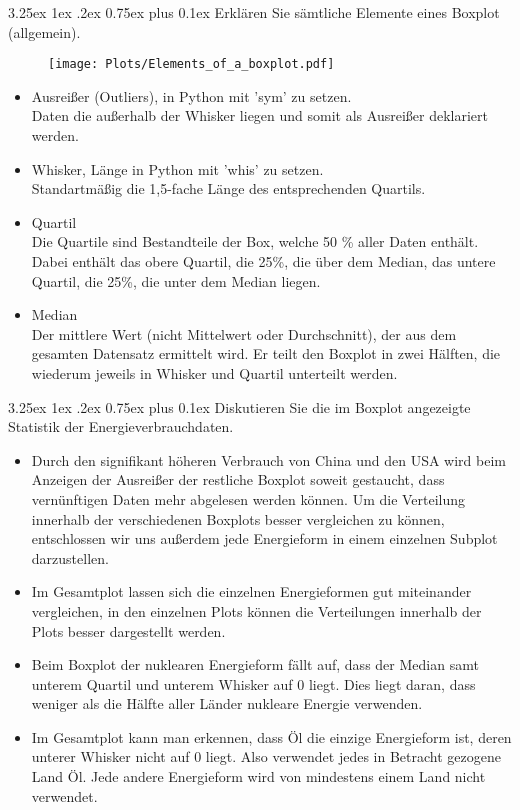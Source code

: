 \documentclass[12pt,a4paper]{scrartcl}
\makeatletter
\renewcommand\subparagraph{\@startsection{subparagraph}{5}{\parindent}%
    {3.25ex \@plus1ex \@minus .2ex}%
    {0.75ex plus 0.1ex}%
    {\normalfont\normalsize\bfseries}}
\makeatother
\begin{document}
\subparagraph{Erkl\"aren Sie s\"amtliche Elemente eines Boxplot (allgemein). }
\begin{figure}[!h]
\centering
\texttt{[image: Plots/Elements\_of\_a\_boxplot.pdf]}
\end{figure}
\begin{itemize}
\item Ausrei\ss er (\grqq Outliers\grqq ), in Python mit 'sym' zu setzen. \\
Daten die au\ss erhalb der Whisker liegen und somit als Ausrei\ss er deklariert werden.
\item Whisker, L\"ange in Python mit 'whis' zu setzen.\\
Standartm\"a\ss ig die 1,5-fache L\"ange des entsprechenden Quartils. 
\item Quartil\\
Die Quartile sind Bestandteile der Box, welche 50 \% aller Daten enth\"alt. Dabei enth\"alt das obere Quartil, die 25\%, die \"uber dem Median, das untere Quartil, die 25\%, die unter dem Median liegen.
\item Median\\
Der mittlere Wert (nicht Mittelwert oder Durchschnitt), der aus dem gesamten Datensatz ermittelt wird. Er teilt den Boxplot in zwei H\"alften, die wiederum jeweils in Whisker und Quartil unterteilt werden.
\end{itemize}

\subparagraph{Diskutieren Sie die im Boxplot angezeigte Statistik der Energieverbrauchdaten.}
\begin{itemize}
\item Durch den signifikant h\"oheren Verbrauch von China und den USA wird beim Anzeigen der Ausrei\ss er der restliche Boxplot soweit gestaucht, dass vern\"unftigen Daten mehr abgelesen werden k\"onnen. 
Um die Verteilung innerhalb der verschiedenen Boxplots besser vergleichen zu k\"onnen, entschlossen wir uns au\ss erdem jede Energieform in einem einzelnen Subplot darzustellen. 
\item Im Gesamtplot lassen sich die einzelnen Energieformen gut miteinander vergleichen, in den einzelnen Plots k\"onnen die Verteilungen innerhalb der Plots besser dargestellt werden.  
\item Beim Boxplot der nuklearen Energieform f\"allt auf, dass der Median samt unterem Quartil und unterem Whisker auf 0 liegt. Dies liegt daran, dass weniger als die H\"alfte aller L\"ander nukleare Energie verwenden. 
\item Im Gesamtplot kann man erkennen, dass \"Ol die einzige Energieform ist, deren unterer Whisker nicht auf 0 liegt. Also verwendet jedes in Betracht gezogene Land \"Ol. Jede andere Energieform wird von mindestens einem Land nicht verwendet. 
\end{itemize}
\end{document}

